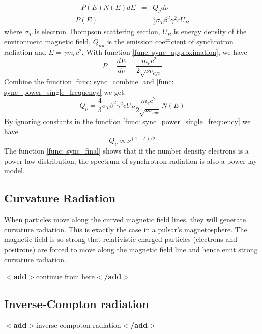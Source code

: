 \documentclass[12pt]{report}
\newcommand{\add}[1]{
  $<$\textbf{add}$>$#1$<$\textbf{/add}$>$
}
\begin{document}
          \begin{eqnarray}
            \label{func: sync_power_single_frequency}
            -P\left(E\right)N\left(E\right)dE &=& Q_{\nu} d\nu\\
            P\left(E\right) &=& \frac{4}{3} \sigma_{T} \beta^2 \gamma^2 c U_B
          \end{eqnarray} 
          where $\sigma_{T}$ is electron Thompson scattering section, $U_B$ is energy density of the environment 
          magnetic field,  $Q_{nu}$ is the emission coefficient of synchrotron radiation 
          and $E=\gamma m_e c^2$. With function \ref{func: sync_approximation}, we have
          \begin{equation}
            \label{func: sync_combine}
            P = \frac{dE}{d\nu} = \frac{m_e c^2}{2\sqrt{\nu \nu_{cyc}}}
          \end{equation}
          Combine the function \ref{func: sync_combine} and \ref{func: sync_power_single_frequency} we get:
          \begin{equation}
            Q_{\nu} = \frac{4}{3} \sigma_{T} \beta^2 \gamma^2 c U_B \frac{m_e c^2}{2\sqrt{\nu \nu_{cyc}}} N\left(E\right)
          \end{equation}
          By ignoring constants in the function \ref{func: sync_power_single_frequency} we have 
          \begin{equation}
            \label{func: sync_final}
            Q_{\nu} \propto \nu^{(1-\delta)/2}
          \end{equation}
          The function \ref{func: sync_final} shows that if the number density electrons is a power-law distribution, 
          the spectrum of synchrotron radiation is also a power-lay model.  


        \subsection{Curvature Radiation}
          When particles move along the curved magnetic field lines, they will generate curvature radiation. This is 
          exactly the case in a pulsar's magnetosphere. The magnetic field is so strong that relativistic 
          charged particles (electrons and positrons) are forced to move along the magnetic field line and hence 
          emit strong curvature radiation. 
          
          \add{continue from here}

        \subsection{Inverse-Compton radiation}
          \add{inverse-compoton radiation}
\end{document}
